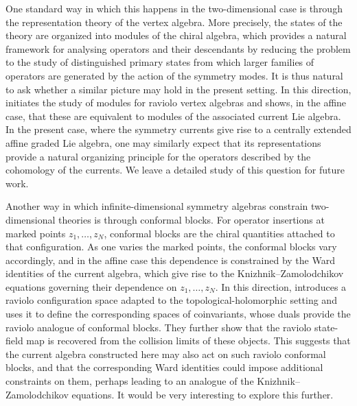 \documentclass[11pt]{amsart}
\numberwithin{equation}{section}
\numberwithin{figure}{section}
\numberwithin{table}{section}
\theoremstyle{thm}
\numberwithin{equation}{subsection}
\theoremstyle{definition}
\theoremstyle{rem}
\begin{document}
One standard way in which this happens in the two-dimensional case is through the representation theory of the vertex algebra. More precisely, the states of the theory are organized into modules of the chiral algebra, which provides a natural framework for analysing operators and their descendants by reducing the problem to the study of distinguished primary states from which larger families of operators are generated by the action of the symmetry modes. It is thus natural to ask whether a similar picture may hold in the present setting. In this direction, \cite{Garner:2023zqn} initiates the study of modules for raviolo vertex algebras and shows, in the affine case, that these are equivalent to modules of the associated current Lie algebra. In the present case, where the symmetry currents give rise to a centrally extended affine graded Lie algebra, one may similarly expect that its representations provide a natural organizing principle for the operators described by the cohomology of the currents. We leave a detailed study of this question for future work.


Another way in which infinite-dimensional symmetry algebras constrain two-dimensional theories is through conformal blocks. For operator insertions at marked points \(z_1,\dots,z_N\), conformal blocks are the chiral quantities attached to that configuration. As one varies the marked points, the conformal blocks vary accordingly, and in the affine case this dependence is constrained by the Ward identities of the current algebra, which give rise to the Knizhnik--Zamolodchikov equations governing their dependence on \(z_1,\dots,z_N\). In this direction, \cite{Alfonsi:2024qdr} introduces a raviolo configuration space adapted to the topological-holomorphic setting and uses it to define the corresponding spaces of coinvariants, whose duals provide the raviolo analogue of conformal blocks. They further show that the raviolo state-field map is recovered from the collision limits of these objects. This suggests that the current algebra constructed here may also act on such raviolo conformal blocks, and that the corresponding Ward identities could impose additional constraints on them, perhaps leading to an analogue of the Knizhnik–Zamolodchikov equations. It would be very interesting to explore this further. 
\end{document}
